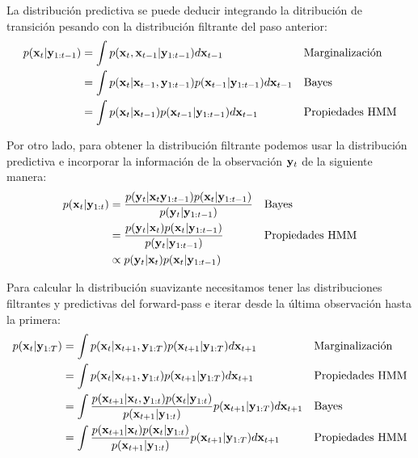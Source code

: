 La distribución predictiva se puede deducir integrando la ditribución de transición pesando con la distribución filtrante del paso anterior:
\begin{align}
    p(\mathbf{x}_t | \mathbf{y}_{1:t-1}) &= \int p(\mathbf{x}_t, \mathbf{x}_{t-1} | \mathbf{y}_{1:t-1}) d\mathbf{x}_{t-1} && \text{Marginalización}\\
    &= \int p(\mathbf{x}_t | \mathbf{x}_{t-1}, \mathbf{y}_{1:t-1}) p(\mathbf{x}_{t-1} | \mathbf{y}_{1:t-1}) d\mathbf{x}_{t-1} && \text{Bayes}\\
    &=\int p(\mathbf{x}_t | \mathbf{x}_{t-1}) p(\mathbf{x}_{t-1} | \mathbf{y}_{1:t-1}) d\mathbf{x}_{t-1} && \text{Propiedades HMM}
\end{align}

Por otro lado, para obtener la distribución filtrante podemos usar la distribución predictiva e incorporar la información de la observación $\mathbf{y}_t$ de la siguiente manera:
\begin{align}
    p(\mathbf{x}_t | \mathbf{y}_{1:t}) &= \frac
            {p(\mathbf{y}_t | \mathbf{x}_t \mathbf{y}_{1:t-1}) p(\mathbf{x}_t | \mathbf{y}_{1:t-1})}
            {p(\mathbf{y}_t | \mathbf{y}_{1:t-1})} && \text{Bayes}\\
    &= \frac{p(\mathbf{y}_t | \mathbf{x}_t) p(\mathbf{x}_t | \mathbf{y}_{1:t-1})}
            {p(\mathbf{y}_t | \mathbf{y}_{1:t-1})} && \text{Propiedades HMM} \label{eq:forward_backward_filter_complete}\\
    &\propto p(\mathbf{y}_t | \mathbf{x}_t) p(\mathbf{x}_t | \mathbf{y}_{1:t-1})
\end{align}

Para calcular la distribución suavizante necesitamos tener las distribuciones filtrantes y predictivas del forward-pass e iterar desde la última observación hasta la primera:
\begin{align}
    p(\mathbf{x}_t | \mathbf{y}_{1:T}) &= 
        \int p(\mathbf{x}_t | \mathbf{x}_{t+1}, \mathbf{y}_{1:T})
             p(\mathbf{x}_{t+1} | \mathbf{y}_{1:T}) d\mathbf{x}_{t+1}
        && \text{Marginalización} \\
    &= \int p(\mathbf{x}_t | \mathbf{x}_{t+1}, \mathbf{y}_{1:t})
             p(\mathbf{x}_{t+1} | \mathbf{y}_{1:T}) d\mathbf{x}_{t+1}
        && \text{Propiedades HMM} \\
    &= \int \frac{p(\mathbf{x}_{t+1} | \mathbf{x}_t, \mathbf{y}_{1:t})p(\mathbf{x}_t |\mathbf{y}_{1:t})}
            {p(\mathbf{x}_{t+1} |\mathbf{y}_{1:t})}
            p(\mathbf{x}_{t+1} | \mathbf{y}_{1:T}) d\mathbf{x}_{t+1}
        && \text{Bayes} \\
    &= \int \frac{p(\mathbf{x}_{t+1} | \mathbf{x}_t)p(\mathbf{x}_t |\mathbf{y}_{1:t})}
            {p(\mathbf{x}_{t+1} |\mathbf{y}_{1:t})}
            p(\mathbf{x}_{t+1} | \mathbf{y}_{1:T}) d\mathbf{x}_{t+1}
        && \text{Propiedades HMM}
\end{align}

